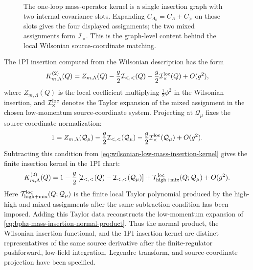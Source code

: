 \begin{figure}[H]
{
  }
  \caption{The one-loop mass-operator kernel is a single insertion graph with
  two internal covariance slots.  Expanding
  \(C_{\Lambda_0}=C_\Lambda+C_>\) on those slots gives the four displayed
  assignments; the two mixed assignments form
  \(\mathcal I_\times\).  This is the graph-level content behind the local
  Wilsonian source-coordinate matching.}
  \label{fig:mass-insertion-source-wilsonian-matching}
\end{figure}

The 1PI insertion computed from the Wilsonian description has the form
\begin{equation}
  K_{m,\Lambda}^{(2)}(Q)
  =
  Z_{m,\Lambda}(Q)
  -
  \frac{g}{2}\mathcal I_{<,<}(Q)
  -
  \frac{g}{2}\mathcal I_\times^{\rm loc}(Q)
  +
  O(g^2),
  \label{eq:wilsonian-low-mass-insertion-kernel}
\end{equation}
where \(Z_{m,\Lambda}(Q)\) is the local coefficient multiplying
\(\frac12\phi^2\) in the Wilsonian insertion, and
\(\mathcal I_\times^{\rm loc}\) denotes the Taylor expansion of the mixed
assignment in the chosen low-momentum source-coordinate system.  Projecting at
\(\mathcal Q_\mu\) fixes the source-coordinate normalization:
\begin{equation}
  1
  =
  Z_{m,\Lambda}(\mathcal Q_\mu)
  -
  \frac{g}{2}\mathcal I_{<,<}(\mathcal Q_\mu)
  -
  \frac{g}{2}\mathcal I_\times^{\rm loc}(\mathcal Q_\mu)
  +
  O(g^2).
  \label{eq:mass-operator-source-coordinate-normalization}
\end{equation}
Subtracting this condition from
\eqref{eq:wilsonian-low-mass-insertion-kernel} gives the finite insertion
kernel in the 1PI chart:
\[
  K_{m,\Lambda}^{(2)}(Q)
  =
  1
  -
  \frac{g}{2}
  \left[
    \mathcal I_{<,<}(Q)-\mathcal I_{<,<}(\mathcal Q_\mu)
  \right]
  +
  \mathcal T_{\rm high+mix}^{\rm loc}(Q;\mathcal Q_\mu)
  +
  O(g^2).
\]
Here \(\mathcal T_{\rm high+mix}^{\rm loc}(Q;\mathcal Q_\mu)\) is the finite
local Taylor polynomial produced by the high-high and mixed assignments after
the same subtraction condition has been imposed.  Adding this Taylor data
reconstructs the low-momentum expansion of
\eqref{eq:bphz-mass-insertion-normal-product}.  Thus the normal product, the
Wilsonian insertion functional, and the 1PI insertion kernel are distinct
representatives of the same source derivative after the finite-regulator
pushforward, low-field integration, Legendre transform, and source-coordinate
projection have been specified.

